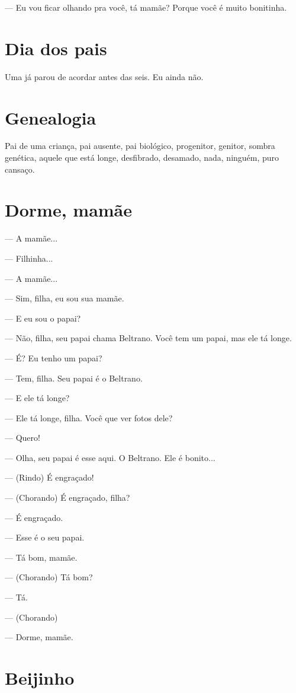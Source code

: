 {— Eu vou ficar olhando pra você, tá mamãe? Porque você é muito
bonitinha.

\chapter{Dia dos pais}

Uma já parou de acordar antes das seis. Eu ainda não.

\chapter{Genealogia}

Pai de uma criança, pai ausente, pai biológico, progenitor, genitor,
sombra genética, aquele que está longe, desfibrado, desamado, nada,
ninguém, puro cansaço.

\chapter{Dorme, mamãe}

— A mamãe...

— Filhinha...

— A mamãe...

— Sim, filha, eu sou sua mamãe.

— E eu sou o papai?

— Não, filha, seu papai chama Beltrano. Você tem um papai, mas ele tá
longe.

— É? Eu tenho um papai?

— Tem, filha. Seu papai é o Beltrano.

— E ele tá longe?

— Ele tá longe, filha. Você que ver fotos dele?

— Quero!

— Olha, seu papai é esse aqui. O Beltrano. Ele é bonito...

— (Rindo) É engraçado!

— (Chorando) É engraçado, filha?

— É engraçado.

— Esse é o seu papai.

— Tá bom, mamãe.

— (Chorando) Tá bom?

— Tá.

— (Chorando)

— Dorme, mamãe.

\chapter{Beijinho}

}
